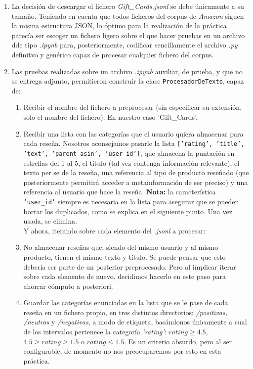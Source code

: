 \documentclass[10pt,a4paper]{article}
\begin{document}
\begin{enumerate}
    \item La decisión de descargar el fichero \textit{Gift\_Cards.jsonl} se debe únicamente a su tamaño. 
    Teniendo en cuenta que todos ficheros del corpus de \textit{Amazon} siguen la misma estructura JSON, 
    lo óptimo para la realización de la práctica parecía ser escoger un fichero ligero sobre el que hacer
    pruebas en un archivo dde tipo \textit{.ipynb} para, posteriormente, codificar sencillamente el archivo 
    \textit{.py} definitvo y genérico capaz de procesar cualquier fichero del corpus. 

    \item Las pruebas realizadas sobre un archivo \textit{.ipynb} auxiliar, de prueba, y que no se entrega adjunto,
     permitieron construir la clase \texttt{ProcesadorDeTexto}, capaz de:

    \begin{enumerate}
        \item Recibir el nombre del fichero a preprocesar (sin especificar su extensión, solo el nombre del fichero). En 
        nuestro caso 'Gift\_Cards'.
        \item Recibir una lista con las categorías que el usuario quiera almacenar para cada reseña. Nosotros aconsejamos 
        pasarle la lista \texttt{['rating', 'title', 'text', 'parent\_asin', 'user\_id']}, que almacena la puntación en estrellas del 1 al 5, 
        el título (tal vez contenga información relevante), el texto per se de la reseña, una referencia al tipo de producto reseñado 
        (que posteriormente permitirá acceder a metainformación de ser preciso) y una referencia al usuario que hace la reseña. 
        \textbf{Nota:} la característica \texttt{'user\_id'} siempre es necesaria en la lista para asegurar que se pueden borrar los duplicados, 
        como se explica en el siguiente punto. Una vez usada, se elimina.\\
        
        Y ahora, iterando sobre cada elemento del \textit{.jsonl} a procesar:\\

        \item No almacenar reseñas que, siendo del mismo usuario y al mismo producto, tienen el mismo texto y título. Se puede pensar que 
        esto debería ser parte de un posterior preprocesado. Pero al implicar iterar sobre cada elemento de nuevo, decidimos hacerlo en este
        paso para ahorrar cómputo a posteriori. 
        \item Guardar las categorías enunciadas en la lista que se le pase de cada reseña en un fichero propio, en tres distintos directorios: 
        \textit{/positivas, /neutras} y \textit{/negativas}, a modo de etiqueta, basándonos únicamente a cual de los intervalos pertenece la
        categoría \textit{'rating'}: $rating\geq4.5$, $4.5 \geq rating \geq 1.5$ o $rating\leq1.5$. Es un criterio absurdo, 
        pero al ser configurable, de momento no nos preocuparemos por esto en esta práctica.  
    \end{enumerate}
 
\end{enumerate}
\end{document}
